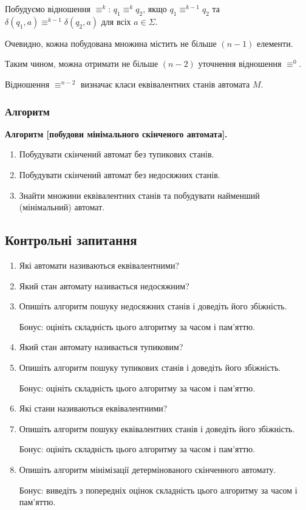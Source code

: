 Побудуємо відношення $\equiv^k$: $q_1 \equiv^k q_2$, якщо $q_1 \equiv^{k - 1} q_2$ та $\delta(q_1,a) \equiv^{k - 1} \delta(q_2, a)$ для всіх $a \in \Sigma$. \medskip

Очевидно, кожна побудована множина містить не більше $(n-1)$ елементи. \medskip

Таким чином, можна отримати не більше $(n-2)$ уточнення відношення $\equiv^0$. \medskip

Відношення $\equiv^{n - 2}$ визначає класи еквівалентних станів автомата $M$.

\subsubsection{Алгоритм}

\textbf{Алгоритм [побудови мінімального скінченого автомата].}
\begin{enumerate}
	\item Побудувати скінчений автомат без тупикових станів.
	\item Побудувати скінчений автомат без недосяжних станів.
	\item Знайти множини еквівалентних станів та побудувати найменший (мінімальний) автомат.
\end{enumerate}

\subsection{Контрольні запитання}

\begin{enumerate}
	\item Які автомати називаються еквівалентними? %
	\item Який стан автомату називається недосяжним? %
	\item Опишіть алгоритм пошуку недосяжних станів і доведіть його збіжність. \smallskip
	
	Бонус: оцініть складність цього алгоритму за часом і пам'\-ят\-тю.
	\item Який стан автомату називається тупиковим? %
	\item Опишіть алгоритм пошуку тупикових станів і доведіть його збіжність. \smallskip
	
	Бонус: оцініть складність цього алгоритму за часом і пам'\-ят\-тю.
	\item Які стани називаються еквівалентними? %
	\item Опишіть алгоритм пошуку еквівалентних станів і доведіть його збіжність. \smallskip
	
	Бонус: оцініть складність цього алгоритму за часом і пам'яттю.
	\item Опишіть алгоритм мінімізації детермінованого скінченного автомату. \smallskip
	
	Бонус: виведіть з попередніх оцінок складність цього алгоритму за часом і пам'яттю.
\end{enumerate}
